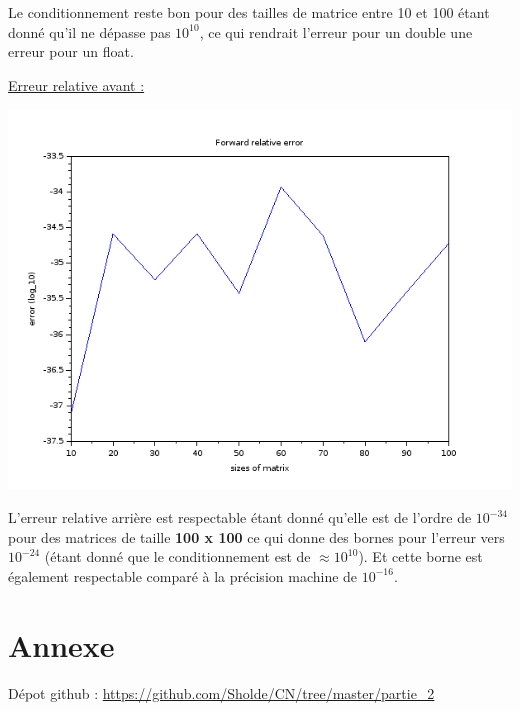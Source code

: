 \documentclass{article}
\begin{document}
Le conditionnement reste bon pour des tailles de matrice entre 10 et
100 étant donné qu'il ne dépasse pas $10^{10}$, ce qui rendrait l'erreur
pour un double une erreur pour un float.\newline

\underline{Erreur relative avant :}

\includegraphics[scale=0.5]{img/lu_compact_error.png}

L'erreur relative arrière est respectable étant donné qu'elle est de
l'ordre de $10^{-34}$ pour des matrices de taille \textbf{100 x 100} ce
qui donne des bornes pour l'erreur vers $10^{-24}$ (étant donné
que le conditionnement est de $\approx 10^{10}$). Et cette
borne est également respectable comparé à la précision machine de
$10^{-16}$.

\section*{Annexe}

Dépot github : \url{https://github.com/Sholde/CN/tree/master/partie_2}
\end{document}
